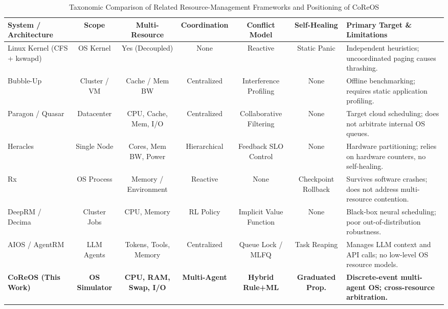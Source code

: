 \documentclass[conference]{IEEEtran}
\begin{document}
\begin{table}[!t]
\caption{Taxonomic Comparison of Related Resource-Management Frameworks and Positioning of CoReOS}
\label{tab:research_gap}
\centering
\footnotesize
\begin{tabularx}{\textwidth}{lcccccX}
\toprule
\textbf{System / Architecture} & \textbf{Scope} & \textbf{Multi-Resource} & \textbf{Coordination} & \textbf{Conflict Model} & \textbf{Self-Healing} & \textbf{Primary Target \& Limitations} \\
\midrule
Linux Kernel (CFS + kswapd)~\cite{silberschatz2018operating} & OS Kernel & Yes (Decoupled) & None & Reactive & Static Panic & Independent heuristics; uncoordinated paging causes thrashing. \\
Bubble-Up~\cite{mars2011bubble} & Cluster / VM & Cache / Mem BW & Centralized & Interference Profiling & None & Offline benchmarking; requires static application profiling. \\
Paragon / Quasar~\cite{delimitrou2013paragon, delimitrou2014quasar} & Datacenter & CPU, Cache, Mem, I/O & Centralized & Collaborative Filtering & None & Target cloud scheduling; does not arbitrate internal OS queues. \\
Heracles~\cite{lo2015heracles} & Single Node & Cores, Mem BW, Power & Hierarchical & Feedback SLO Control & None & Hardware partitioning; relies on hardware counters, no self-healing. \\
Rx~\cite{qin2005rx} & OS Process & Memory / Environment & Reactive & None & Checkpoint Rollback & Survives software crashes; does not address multi-resource contention. \\
DeepRM / Decima~\cite{mao2016resource, mao2019learning} & Cluster Jobs & CPU, Memory & RL Policy & Implicit Value Function & None & Black-box neural scheduling; poor out-of-distribution robustness. \\
AIOS / AgentRM~\cite{mei2024aios, agentrm2026} & LLM Agents & Tokens, Tools, Memory & Centralized & Queue Lock / MLFQ & Task Reaping & Manages LLM context and API calls; no low-level OS resource models. \\
\textbf{CoReOS (This Work)} & \textbf{OS Simulator} & \textbf{CPU, RAM, Swap, I/O} & \textbf{Multi-Agent} & \textbf{Hybrid Rule+ML} & \textbf{Graduated Prop.} & \textbf{Discrete-event multi-agent OS; cross-resource arbitration.} \\
\bottomrule
\end{tabularx}
\end{table}
\end{document}
